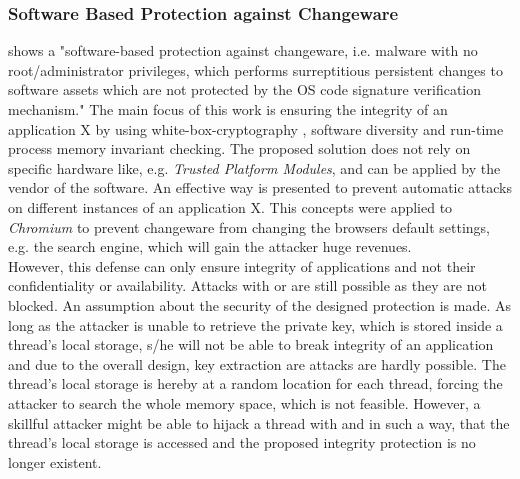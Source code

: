 \subsubsection{Software Based Protection against Changeware}
\cite{changeware} shows a "software-based protection against changeware, i.e. malware with no root/administrator privileges, which performs surreptitious persistent changes to software assets which are not protected by the OS code signature verification mechanism." The main focus of this work is ensuring the integrity of an application X by using white-box-cryptography \cite{wbcrypto}, software diversity \cite{Forrest} and run-time process memory invariant checking. The proposed solution does not rely on specific hardware like, e.g. \emph{Trusted Platform Modules}, and can be applied by the vendor of the software. An effective way is presented to prevent automatic attacks on different instances of an application X. This concepts were applied to \emph{Chromium} to prevent changeware from changing the browsers default settings, e.g. the search engine, which will gain the attacker huge revenues.\\
However, this defense can only ensure integrity of applications and not their confidentiality or availability. Attacks with  or  are still possible as they are not blocked. An assumption about the security of the designed protection is made. As long as the attacker is unable to retrieve the private key, which is stored inside a thread's local storage, s/he will not be able to break integrity of an application and due to the overall design, key extraction are attacks are hardly possible. The thread's local storage is hereby at a random location for each thread, forcing the attacker to search the whole memory space, which is not feasible. However, a skillful attacker might be able to hijack a thread with  and  in such a way, that the thread's local storage is accessed and the proposed integrity protection is no longer existent.